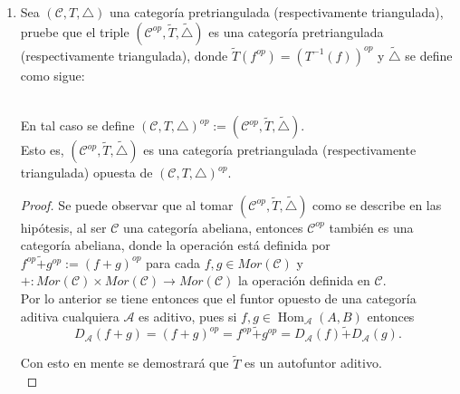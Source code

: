 \documentclass{article}
\begin{document}
\begin{enumerate}[label=\textbf{Ej \arabic*.}]
\begin{proof}
\begin{align*}
		\end{align*}
		son diagramas conmutativos en $\mathscr{C}$, se verifica que $\nu,\chi\in\Delta$.\\
		\end{proof}
		\item Sea $(\mathscr{C},T,\triangle)$ una categoría pretriangulada (respectivamente triangulada), pruebe que el triple 
		$(\mathscr{C}^{op},\tilde{T},\tilde{\triangle})$ es una categoría pretriangulada (respectivamente triangulada), donde 
		$\tilde{T}(f^{op})=(T^{-1}(f))^{op}$ y $\tilde{\triangle}$ se define como sigue:\\
		\centerline{
		}\\
		
		En tal caso se define $(\mathscr{C},T,\triangle)^{op}:=(\mathscr{C}^{op},\tilde{T},\tilde{\triangle}).$\\
		Esto es, $(\mathscr{C}^{op},\tilde{T},\tilde{\triangle})$ es una categoría pretriangulada (respectivamente triangulada) opuesta de
		$(\mathscr{C},T,\triangle)^{op}$.
		
		\begin{proof}
			
			Se puede observar que al tomar  $(\mathscr{C}^{op},\tilde{T},\tilde{\triangle})$ como se describe en las hipótesis, al ser $\mathscr{C}$ 
			una categoría abeliana, entonces $\mathscr{C}^{op}$ también es una categoría abeliana, donde la operación está definida por \\
			$f^{op}\tilde{+}g^{op}:=(f+g)^{op}$ para cada $f,g\in Mor(\mathscr{C})$ y\\
			$+: Mor(\mathscr{C})\times Mor(\mathscr{C})\rightarrow Mor(\mathscr{C})$ la operación definida en $ \mathscr{C}$.\\
			
			Por lo anterior se tiene entonces que el funtor opuesto de una categoría aditiva cualquiera $\mathscr{A}$ es aditivo, pues si $f,g\in 
			\operatorname{Hom}_{\mathscr{A}}(A,B)$ entonces 
			\[D_{\mathscr{A}}(f+g)=(f+g)^{op}=f^{op}\tilde{+}g^{op}=D_{\mathscr{A}}(f)\tilde{+}D_{\mathscr{A}}(g).\]
			
			Con esto en mente se demostrará que $\tilde{T}$ es un autofuntor aditivo.\\
			

\end{proof}
\end{enumerate}
\end{document}
